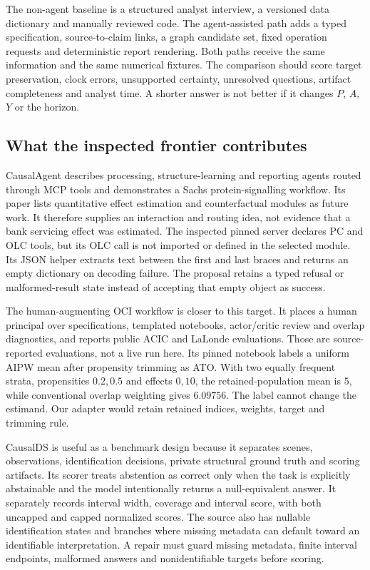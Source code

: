 The non-agent baseline is a structured analyst interview, a versioned data dictionary and manually reviewed code. The agent-assisted path adds a typed specification, source-to-claim links, a graph candidate set, fixed operation requests and deterministic report rendering. Both paths receive the same information and the same numerical fixtures. The comparison should score target preservation, clock errors, unsupported certainty, unresolved questions, artifact completeness and analyst time. A shorter answer is not better if it changes $P$, $A$, $Y$ or the horizon.

\subsection{What the inspected frontier contributes}

CausalAgent describes processing, structure-learning and reporting agents routed through MCP tools and demonstrates a Sachs protein-signalling workflow. Its paper lists quantitative effect estimation and counterfactual modules as future work. It therefore supplies an interaction and routing idea, not evidence that a bank servicing effect was estimated. The inspected pinned server declares PC and OLC tools, but its OLC call is not imported or defined in the selected module. Its JSON helper extracts text between the first and last braces and returns an empty dictionary on decoding failure. The proposal retains a typed refusal or malformed-result state instead of accepting that empty object as success. \citep{exec13_data_causalagent,exec13_data_causalagent_code}

The human-augmenting OCI workflow is closer to this target. It places a human principal over specifications, templated notebooks, actor/critic review and overlap diagnostics, and reports public ACIC and LaLonde evaluations. Those are source-reported evaluations, not a live run here. Its pinned notebook labels a uniform AIPW mean after propensity trimming as ATO. With two equally frequent strata, propensities $0.2,0.5$ and effects $0,10$, the retained-population mean is $5$, while conventional overlap weighting gives $6.09756$. The label cannot change the estimand. Our adapter would retain retained indices, weights, target and trimming rule. \citep{exec13_data_oci,exec13_data_oci_code}

CausalDS is useful as a benchmark design because it separates scenes, observations, identification decisions, private structural ground truth and scoring artifacts. Its scorer treats abstention as correct only when the task is explicitly abstainable and the model intentionally returns a null-equivalent answer. It separately records interval width, coverage and interval score, with both uncapped and capped normalized scores. The source also has nullable identification states and branches where missing metadata can default toward an identifiable interpretation. A repair must guard missing metadata, finite interval endpoints, malformed answers and nonidentifiable targets before scoring. \citep{exec13_data_causalds,exec13_data_causalds_code}

